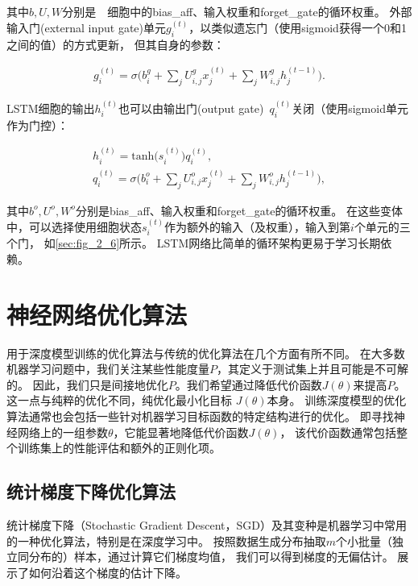 其中$b, U, W$分别是~~细胞中的\gls{bias_aff}、输入权重和\gls{forget_gate}的循环权重。
外部输入门(external input gate)单元$g_i^{(t)}$，以类似遗忘门（使用sigmoid获得一个0和1之间的值）的方式更新，
但其自身的参数：\par

\begin{equation}
	\begin{aligned}
	g_i^{(t)} = \sigma \Big( b_i^g + \sum_j U_{i,j}^g x_j^{(t)} + \sum_j W_{i,j}^g h_j^{(t-1)} \Big).
	\end{aligned}
\end{equation}

LSTM细胞的输出$h_i^{(t)}$也可以由输出门(output gate)~$q_i^{(t)}$关闭（使用sigmoid单元作为门控）：\par
\begin{equation}
	\begin{gathered}
		h_i^{(t)} = \text{tanh}\big( s_i^{(t)} \big) q_i^{(t)}, \\
		q_i^{(t)} = \sigma \Big( b_i^o + \sum_j U_{i,j}^o x_j^{(t)} + \sum_j W_{i,j}^o h_j^{(t-1)} \Big),
	\end{gathered}
\end{equation}

其中$b^o, U^o, W^o$分别是\gls{bias_aff}、输入权重和\gls{forget_gate}的循环权重。
在这些变体中，可以选择使用细胞状态$s_i^{(t)}$作为额外的输入（及权重），输入到第$i$个单元的三个门，
如\ref{sec:fig_2_6}所示。
LSTM网络比简单的循环架构更易于学习长期依赖。

\section{神经网络优化算法}
用于深度模型训练的优化算法与传统的优化算法在几个方面有所不同。 
在大多数机器学习问题中，我们关注某些性能度量$P$，其定义于测试集上并且可能是不可解的。
因此，我们只是间接地优化$P$。我们希望通过降低代价函数$J(\theta)$来提高$P$。
这一点与纯粹的优化不同，纯优化最小化目标 $J(\theta)$本身。
训练深度模型的优化算法通常也会包括一些针对机器学习目标函数的特定结构进行的优化。
即寻找神经网络上的一组参数$\theta$，它能显著地降低代价函数$J(\theta)$，
该代价函数通常包括整个训练集上的性能评估和额外的正则化项。

\subsection{统计梯度下降优化算法}
\label{sec_chap8}
统计梯度下降（Stochastic Gradient Descent，SGD）及其变种是机器学习中常用的一种优化算法，特别是在深度学习中。
按照数据生成分布抽取$m$个小批量（独立同分布的）样本，通过计算它们梯度均值，
我们可以得到梯度的无偏估计。
展示了如何沿着这个梯度的估计下降。

